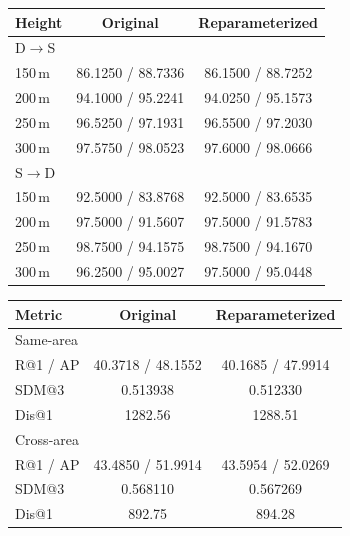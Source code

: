 \par\medskip\noindent\begin{minipage}{\columnwidth}
\captionsetup{type=table}
\centering
\caption{SUES-200 retrieval before and after reparameterization. Cells report R@1 / AP (\%).}
\label{tab:supp-reparam-sues}
{\footnotesize\setlength{\tabcolsep}{2pt}\renewcommand{\arraystretch}{1.04}
\begin{tabular*}{\columnwidth}{@{\extracolsep{\fill}}lcc@{}}
\toprule
Height & Original & Reparameterized \\
\midrule
\multicolumn{3}{l}{D$\rightarrow$S} \\
150\,m & 86.1250 / 88.7336 & 86.1500 / 88.7252 \\
200\,m & 94.1000 / 95.2241 & 94.0250 / 95.1573 \\
250\,m & 96.5250 / 97.1931 & 96.5500 / 97.2030 \\
300\,m & 97.5750 / 98.0523 & 97.6000 / 98.0666 \\
\midrule
\multicolumn{3}{l}{S$\rightarrow$D} \\
150\,m & 92.5000 / 83.8768 & 92.5000 / 83.6535 \\
200\,m & 97.5000 / 91.5607 & 97.5000 / 91.5783 \\
250\,m & 98.7500 / 94.1575 & 98.7500 / 94.1670 \\
300\,m & 96.2500 / 95.0027 & 97.5000 / 95.0448 \\
\bottomrule
\end{tabular*}}
\end{minipage}\par\medskip

\par\medskip\noindent\begin{minipage}{\columnwidth}
\captionsetup{type=table}
\centering
\caption{GTA-UAV D$\rightarrow$S results before and after reparameterization. R@1 and AP are percentages, and Dis@1 is in meters.}
\label{tab:supp-reparam-gta}
{\footnotesize\setlength{\tabcolsep}{2pt}\renewcommand{\arraystretch}{1.04}
\begin{tabular*}{\columnwidth}{@{\extracolsep{\fill}}lcc@{}}
\toprule
Metric & Original & Reparameterized \\
\midrule
\multicolumn{3}{l}{Same-area} \\
R@1 / AP & 40.3718 / 48.1552 & 40.1685 / 47.9914 \\
SDM@3 & 0.513938 & 0.512330 \\
Dis@1 & 1282.56 & 1288.51 \\
\midrule
\multicolumn{3}{l}{Cross-area} \\
R@1 / AP & 43.4850 / 51.9914 & 43.5954 / 52.0269 \\
SDM@3 & 0.568110 & 0.567269 \\
Dis@1 & 892.75 & 894.28 \\
\bottomrule
\end{tabular*}}
\end{minipage}\par\medskip

